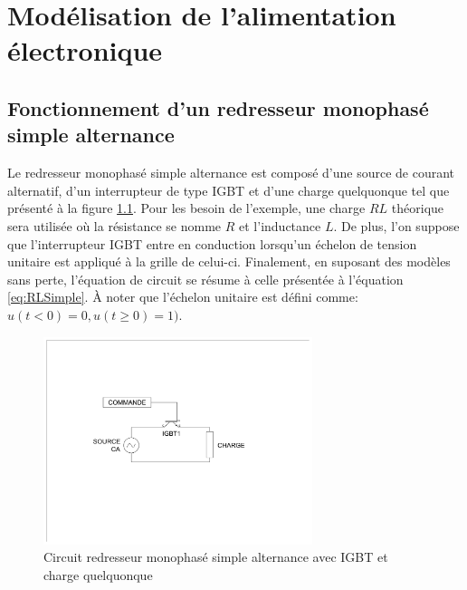 


\chapter{Modélisation de l'alimentation électronique}
\section{Fonctionnement d'un redresseur monophasé simple alternance}
Le redresseur monophasé simple alternance est composé d'une source de courant alternatif, d'un interrupteur de type IGBT et d'une charge quelquonque tel que présenté à la figure \ref{fig:RedresseurMonophaseSimpleAlternanceIGBT}. Pour les besoin de l'exemple, une charge $RL$ théorique sera utilisée où la résistance se nomme $R$ et l'inductance $L$. De plus, l'on suppose que l'interrupteur IGBT entre en conduction lorsqu'un échelon de tension unitaire est appliqué à la grille de celui-ci. Finalement, en suposant des modèles sans perte, l'équation de circuit se résume à celle présentée à l'équation \ref{eq:RLSimple}. À noter que l'échelon unitaire est défini comme: $u(t<0) = 0, u(t\geq 0) = 1)$.

\begin{figure}[htb!]
	\begin{center}  
		\includegraphics[width=0.7\textwidth]{Circuit/RedresseurMonophaseSimpleAlternanceIGBT}
		\caption{Circuit redresseur monophasé simple alternance avec IGBT et charge quelquonque}
		\label{fig:RedresseurMonophaseSimpleAlternanceIGBT}
	\end{center}   
\end{figure}


